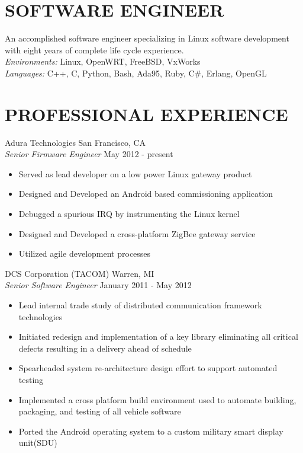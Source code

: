 \documentclass[line]{res}
\begin{document}
\address{San Mateo, CA}
\address{mathew.prokos@gmail.com}

\begin{resume}
\section{SOFTWARE ENGINEER}
    \vspace{1mm}
    An accomplished software engineer specializing in Linux software development with eight years of complete life cycle experience.\\

    \vspace{-5mm}
    {\sl Environments:} Linux, OpenWRT, FreeBSD, VxWorks\\
    {\sl Languages:} C++, C, Python, Bash, Ada95, Ruby, C\#, Erlang, OpenGL\\

\vspace{-5mm}
\section{PROFESSIONAL EXPERIENCE}
    \vspace{1mm}
    Adura Technologies  \hfill San Francisco, CA\\
    {\sl Senior Firmware Engineer} \hfill May  2012 - present
    \vspace{1mm}
    \begin{itemize}
       \item Served as lead developer on a low power Linux gateway product
       \item Designed and Developed an Android based commissioning application
       \item Debugged a spurious IRQ by instrumenting the Linux kernel
       \item Designed and Developed a cross-platform ZigBee gateway service
       \item Utilized agile development processes
    \end{itemize}
    \vspace{-1mm}
    DCS Corporation (TACOM)  \hfill Warren, MI\\
    {\sl Senior Software Engineer} \hfill January 2011 - May 2012
    \vspace{1mm}
    \begin{itemize} 
       \item Lead internal trade study of distributed communication framework
       technologies
       \item Initiated redesign and implementation of a key library eliminating all critical defects resulting in a delivery ahead of schedule
       \item Spearheaded system re-architecture design effort to support automated testing 
       \item Implemented a cross platform build environment used to automate
       building, packaging, and testing of all vehicle software 
       \item Ported the Android operating system to a custom military smart display unit(SDU) 
    \end{itemize}


\end{resume}
\end{document}
